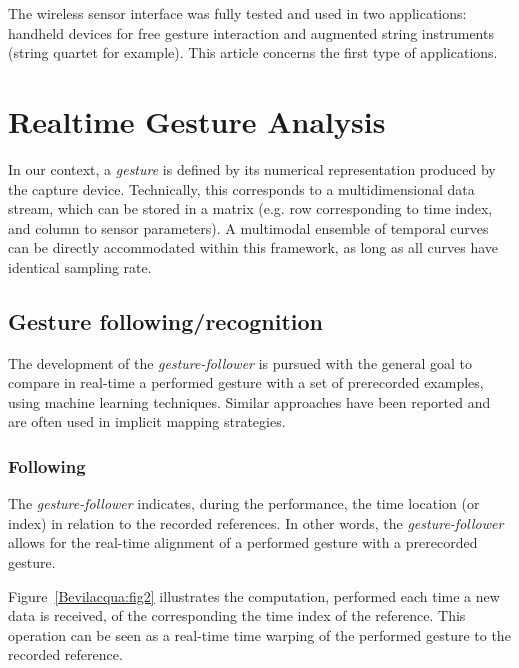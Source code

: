 The wireless sensor interface was fully tested and used in two applications: handheld devices for free gesture interaction and augmented string instruments (string quartet for example). This article concerns the first type of applications.

\section{Realtime Gesture Analysis}
In our context, a \emph{gesture} is defined by its numerical representation produced by the capture device. Technically, this corresponds to a multidimensional data stream, which can be stored in a matrix (e.g. row corresponding to time index, and column to sensor parameters). A multimodal ensemble of temporal curves can be directly accommodated within this framework, as long as all curves have identical sampling rate. 

\subsection{Gesture following/recognition}
The development of the \emph{gesture-follower} is pursued with the general goal to compare in real-time a performed gesture with a set of prerecorded examples, using machine learning techniques. Similar approaches have been reported \cite{Coduys:2004,Kolesnik:2004,Lee:2006,Lee:2006a,Merrill:2005,Pritchard:2006} and are often used in implicit mapping strategies.


\subsubsection{Following}
The \emph{gesture-follower} indicates, during the performance, the time location (or index) in relation to the recorded references. In other words, the \emph{gesture-follower} allows for the real-time alignment of a performed gesture with a prerecorded gesture. 

Figure~\ref{Bevilacqua:fig2} illustrates the computation, performed each time a new data is received, of the corresponding the time index of the reference. This operation can be seen as a real-time time warping of the performed gesture to the recorded reference. 

